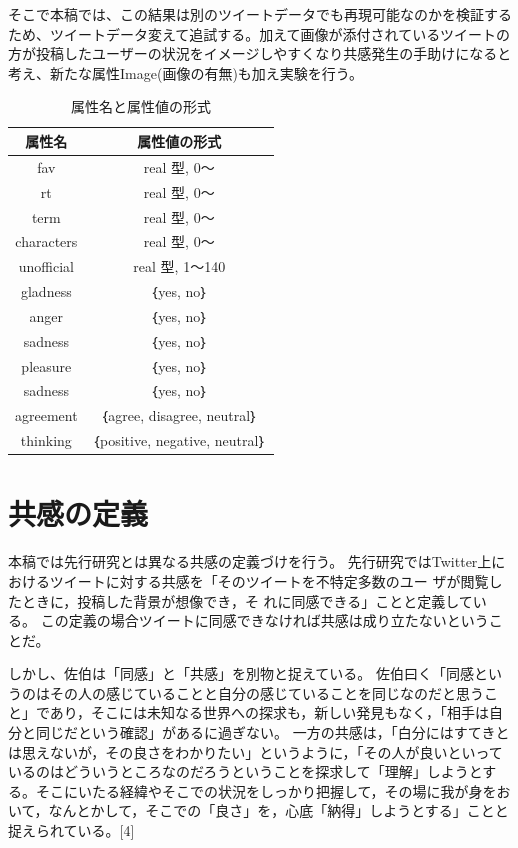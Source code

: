 \documentclass[dvipdfmx]{issj}
\begin{document}
そこで本稿では、この結果は別のツイートデータでも再現可能なのかを検証するため、ツイートデータ変えて追試する。加えて画像が添付されているツイートの方が投稿したユーザーの状況をイメージしやすくなり共感発生の手助けになると考え、新たな属性Image(画像の有無)も加え実験を行う。



\begin{table}[h]\centering
\caption{属性名と属性値の形式}\label{tbl:font}
\begin{small}
\begin{tabular}{|c|c|} \hline
属性名            & 属性値の形式\\\hline\hline
fav & real 型, 0～\\\hline
rt  &  real 型, 0～\\\hline
term  & real 型, 0～\\\hline
characters         & real 型, 0～\\\hline
unofficial      &  real 型, 1～140\\\hline
gladness & ｛yes, no｝\\\hline
anger & ｛yes, no｝\\\hline
sadness & ｛yes, no｝\\\hline
pleasure & ｛yes, no｝\\\hline
sadness & ｛yes, no｝\\\hline
agreement & ｛agree, disagree, neutral｝\\\hline
thinking & ｛positive, negative, neutral｝\\\hline
\end{tabular}
\end{small}
\end{table}

\newpage

\section{共感の定義}  %
本稿では先行研究とは異なる共感の定義づけを行う。
先行研究ではTwitter上におけるツイートに対する共感を「そのツイートを不特定多数のユー ザが閲覧したときに，投稿した背景が想像でき，そ れに同感できる」ことと定義している。
この定義の場合ツイートに同感できなければ共感は成り立たないということだ。


しかし、佐伯は「同感」と「共感」を別物と捉えている。
佐伯曰く「同感というのはその人の感じていることと自分の感じていることを同じなのだと思うこと」であり，そこには未知なる世界への探求も，新しい発見もなく，「相手は自分と同じだという確認」があるに過ぎない。
一方の共感は，「白分にはすてきとは思えないが，その良さをわかりたい」というように，「その人が良いといっているのはどういうところなのだろうということを探求して「理解」しようとする。そこにいたる経緯やそこでの状況をしっかり把握して，その場に我が身をおいて，なんとかして，そこでの「良さ」を，心底「納得」しようとする」ことと捉えられている。[4]
\end{document}
